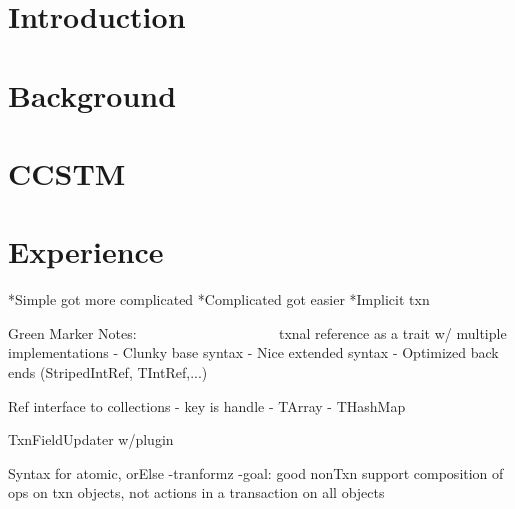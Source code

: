 \documentclass[preprint]{sigplanconf}
\newcommand{\codesec}[1]{{\fontsize{10}{12}\selectfont \tt \bfseries #1}}
\newcommand{\typesec}[1]{{\codesec{\itshape #1}}}
\newcommand{\typeparamsec}[1]{{\codesec{\bfseries #1}}}
\newcommand{\xtypesec}[2]{{\typesec{#1}\typeparamsec{[#2]}}}
\begin{document}

\terms
\xterms

\keywords
\xkeywords

\section{Introduction}
\label{sec:intro}


\section{Background}
\label{sec:library}


\section{CCSTM}
\label{sec:ref}


\section{Experience}
%
*Simple got more complicated
*Complicated got easier
*Implicit txn


Green Marker Notes:
~~~~~~~~~~~~~~~~~~~
txnal reference as a trait
    w/ multiple implementations
  - Clunky base syntax
  - Nice extended syntax
  - Optimized back ends (StripedIntRef, TIntRef,...)

Ref interface to collections
  - key is handle
  - TArray
  - THashMap

TxnFieldUpdater w/plugin

Syntax for atomic, orElse
  -tranformz
  -goal: good nonTxn support
        composition of ops on txn objects, 
        not actions in a transaction on all objects

\end{document}
